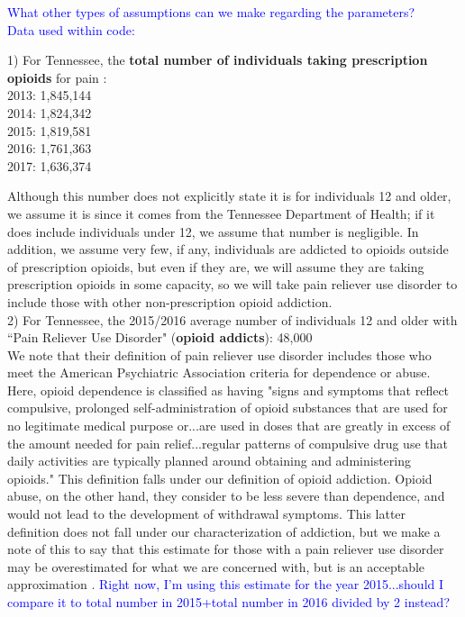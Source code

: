 \documentclass[12pt]{article}
\begin{document}
\textcolor{blue}{What other types of assumptions can we make regarding the parameters?} \\
 
 \textcolor{blue}{Data used within code:} 
 
1) For Tennessee, the \textbf{total number of individuals taking prescription opioids} for pain \cite{TNgov1}: \\
2013: 1,845,144 \\
2014: 1,824,342 \\
2015: 1,819,581 \\
2016: 1,761,363 \\
2017: 1,636,374 

Although this number does not explicitly state it is for individuals 12 and older, we assume it is since it comes from the Tennessee Department of Health; if it does include individuals under 12, we assume that number is negligible. In addition, we assume very few, if any, individuals are addicted to opioids outside of prescription opioids, but even if they are, we will assume they are taking prescription opioids in some capacity, so we will take pain reliever use disorder to include those with other non-prescription opioid addiction. \\

2) For Tennessee, the 2015/2016 average number of individuals 12 and older with ``Pain Reliever Use Disorder" (\textbf{opioid addicts}): 48,000 \cite{NSDUH2} \\
We note that their definition of pain reliever use disorder includes those who meet the American Psychiatric Association criteria for dependence or abuse. Here, opioid dependence is classified as having "signs and symptoms that reflect compulsive, prolonged self-administration of opioid substances that are used for no legitimate medical purpose or...are used in doses that are greatly in excess of the amount needed for pain relief...regular patterns of compulsive drug use that daily activities are typically planned around obtaining and administering opioids." This definition falls under our definition of opioid addiction. Opioid abuse, on the other hand, they consider to be less severe than dependence, and would not lead to the development of withdrawal symptoms. This latter definition does not fall under our characterization of addiction, but we make a note of this to say that this estimate for those with a pain reliever use disorder may be overestimated for what we are concerned with, but is an acceptable approximation \cite{DSM}. \textcolor{blue}{Right now, I'm using this estimate for the year 2015...should I compare it to total number in 2015+total number in 2016 divided by 2 instead?} \\
\end{document}
